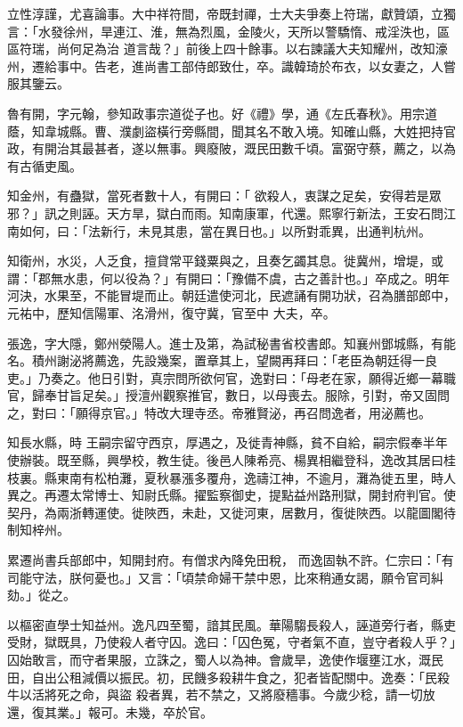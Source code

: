 \begin{pinyinscope}
 立性淳謹，尤喜論事。大中祥符間，帝既封禪，士大夫爭奏上符瑞，獻贊頌，立獨言：「水發徐州，旱連江、淮，無為烈風，金陵火，天所以警驕惰、戒淫泆也，區區符瑞，尚何足為治
 道言哉？」前後上四十餘事。以右諫議大夫知耀州，改知濠州，遷給事中。告老，進尚書工部侍郎致仕，卒。識韓琦於布衣，以女妻之，人嘗服其鑒云。



 魯有開，字元翰，參知政事宗道從子也。好《禮》學，通《左氏春秋》。用宗道蔭，知韋城縣。曹、濮劇盜橫行旁縣間，聞其名不敢入境。知確山縣，大姓把持官政，有開治其最甚者，遂以無事。興廢陂，溉民田數千頃。富弼守蔡，薦之，以為有古循吏風。



 知金州，有蠱獄，當死者數十人，有開曰：「
 欲殺人，衷謀之足矣，安得若是眾邪？」訊之則誣。天方旱，獄白而雨。知南康軍，代還。熙寧行新法，王安石問江南如何，曰：「法新行，未見其患，當在異日也。」以所對乖異，出通判杭州。



 知衛州，水災，人乏食，擅貸常平錢粟與之，且奏乞蠲其息。徙冀州，增堤，或謂：「郡無水患，何以役為？」有開曰：「豫備不虞，古之善計也。」卒成之。明年河決，水果至，不能冒堤而止。朝廷遣使河北，民遮誦有開功狀，召為膳部郎中，元祐中，歷知信陽軍、洺滑州，復守冀，官至中
 大夫，卒。



 張逸，字大隱，鄭州滎陽人。進士及第，為試秘書省校書郎。知襄州鄧城縣，有能名。積州謝泌將薦逸，先設幾案，置章其上，望闕再拜曰：「老臣為朝廷得一良吏。」乃奏之。他日引對，真宗問所欲何官，逸對曰：「母老在家，願得近鄉一幕職官，歸奉甘旨足矣。」授澶州觀察推官，數日，以母喪去。服除，引對，帝又固問之，對曰：「願得京官。」特改大理寺丞。帝雅賢泌，再召問逸者，用泌薦也。



 知長水縣，時
 王嗣宗留守西京，厚遇之，及徙青神縣，貧不自給，嗣宗假奉半年使辦裝。既至縣，興學校，教生徒。後邑人陳希亮、楊異相繼登科，逸改其居曰桂枝裏。縣東南有松柏灘，夏秋暴漲多覆舟，逸禱江神，不逾月，灘為徙五里，時人異之。再遷太常博士、知尉氏縣。擢監察御史，提點益州路刑獄，開封府判官。使契丹，為兩浙轉運使。徙陜西，未赴，又徙河東，居數月，復徙陜西。以龍圖閣待制知梓州。



 累遷尚書兵部郎中，知開封府。有僧求內降免田稅，
 而逸固執不許。仁宗曰：「有司能守法，朕何憂也。」又言：「頃禁命婦干禁中恩，比來稍通女謁，願令官司糾劾。」從之。



 以樞密直學士知益州。逸凡四至蜀，諳其民風。華陽騶長殺人，誣道旁行者，縣吏受財，獄既具，乃使殺人者守囚。逸曰：「囚色冤，守者氣不直，豈守者殺人乎？」囚始敢言，而守者果服，立誅之，蜀人以為神。會歲旱，逸使作堰壅江水，溉民田，自出公租減價以振民。初，民饑多殺耕牛食之，犯者皆配關中。逸奏：「民殺牛以活將死之命，與盜
 殺者異，若不禁之，又將廢穡事。今歲少稔，請一切放還，復其業。」報可。未幾，卒於官。




\end{pinyinscope}
